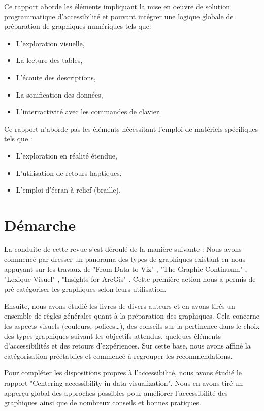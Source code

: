\documentclass[a4paper,12pt]{article}
\begin{document}
\begin{multicols}{2}
Ce rapport aborde les éléments impliquant la mise en oeuvre de solution programmatique d'accessibilité et pouvant intégrer une logique globale de préparation de graphiques numériques tels que:
\begin{itemize}
\item L'exploration visuelle,
\item La lecture des tables,
\item L'écoute des descriptions,
\item La sonification des données,
\item L'interractivité avec les commandes de clavier.
\end{itemize}

Ce rapport n'aborde pas les éléments nécessitant l'emploi de matériels spécifiques tels que :
\begin{itemize}
\item L'exploration en réalité étendue,
\item L'utilisation de retours haptiques,
\item L'emploi d'écran à relief (braille).
\end{itemize}
\section*{Démarche}
\label{sec:orgd4231cd}
La conduite de cette revue s'est déroulé de la manière suivante :
Nous avons commencé par dresser un panorama des types de graphiques existant en nous appuyant sur les travaux de "From Data to Viz" \autocite{yanholtzDataViz2018}, "The Graphic Continuum" \autocite{jonathanschwabishGraphicContinuum2014}, "Lexique Visuel" \autocite{alansmithLexiqueVisuel}, "Insights for ArcGis" \autocite{lindabealeInsightsArcGIS2017}.
Cette première action nous a permis de pré-catégoriser les graphiques selon leurs utilisation.

Ensuite, nous avons étudié les livres de divers auteurs et en avons tirés un ensemble de rêgles générales quant à la préparation des graphiques. Cela concerne les aspects visuels (couleurs, polices\ldots{}), des conseils sur la pertinence dans le choix des types graphiques suivant les objectifs attendus, quelques éléments d'accessibilités et des retours d'expériences. Sur cette base, nous avons affiné la catégorisation préétablies et commencé à regrouper les recommendations.

Pour compléter les dispositions propres à l'accessibilité, nous avons étudié le rapport "Centering accessibility in data visualization". \autocite{schwabishCenteringAccessibilityData2022} Nous en avons tiré un apperçu global des approches possibles pour améliorer l'accessibilité des graphiques ainsi que de nombreux conseils et bonnes pratiques.


\end{multicols}
\end{document}
